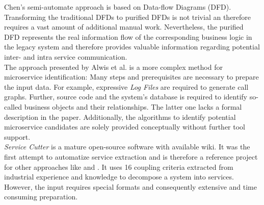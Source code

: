 Chen's semi-automate approach \cite{DataflowDrivenChen} is based on Data-flow Diagrams (DFD). Transforming the traditional DFDs to purified DFDs is not trivial an therefore requires a vast amount of additional manual work. Nevertheless, the purified DFD represents the real information flow of the corresponding business logic in the legacy system and therefore provides valuable information regarding potential inter- and intra service communication. \\

The approach presented by Alwis et al. \cite{HeuristicsAlwis} is a more complex method for microservice identification: Many steps and 
prerequisites are necessary to prepare the input data. For example, expressive \textit{Log Files} are required to generate call graphs. Further, source code and the system's database is required to identify so-called business objects and their relationships. The latter one lacks a formal description in the paper. 
Additionally, the algorithms to identify potential microservice candidates are solely provided conceptually without further tool support. \\

\textit{Service Cutter} \cite{ServiceCutter} is a mature open-source software with available wiki. It was the first attempt to automatize service extraction and is therefore a reference project for other approaches like \cite{ExtractionMazlami} and \cite{DataflowDrivenChen}. It uses 16 coupling criteria extracted from industrial experience and knowledge to decompose a system into services. However, the input requires special formats and consequently extensive and time consuming preparation.








